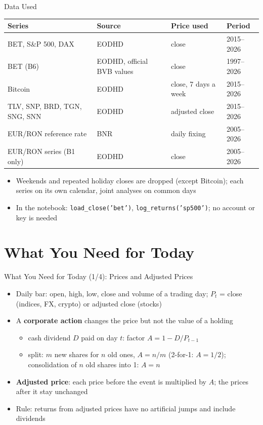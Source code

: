 \begin{frame}{Data Used}
\itemsize{\small}
\begin{center}
\footnotesize
\begin{tabular}{llll}
\toprule
\textbf{Series} & \textbf{Source} & \textbf{Price used} & \textbf{Period} \\
\midrule
BET, S\&P 500, DAX & EODHD & close & 2015--2026 \\
BET (B6) & EODHD, official BVB values & close & 1997--2026 \\
Bitcoin & EODHD & close, 7 days a week & 2015--2026 \\
TLV, SNP, BRD, TGN, SNG, SNN & EODHD & adjusted close & 2015--2026 \\
EUR/RON reference rate & BNR & daily fixing & 2005--2026 \\
EUR/RON series (B1 only) & EODHD & close & 2005--2026 \\
\bottomrule
\end{tabular}
\end{center}
\begin{itemize}
    \item Weekends and repeated holiday closes are dropped (except Bitcoin); each series on its own calendar, joint analyses on common days
    \item In the notebook: \texttt{load\_close('bet')}, \texttt{log\_returns('sp500')}; no account or key is needed
\end{itemize}
\end{frame}


\section{What You Need for Today}

\begin{frame}{What You Need for Today (1/4): Prices and Adjusted Prices}
\itemsize{\small}
\begin{itemize}
    \item Daily bar: open, high, low, close and volume of a trading day; $P_t$ = close (indices, FX, crypto) or adjusted close (stocks)
    \item A \textbf{corporate action} changes the price but not the value of a holding
    \begin{itemize}
        \item cash dividend $D$ paid on day $t$: factor $A = 1 - D/P_{t-1}$
        \item split: $m$ new shares for $n$ old ones, $A = n/m$ (2-for-1: $A = 1/2$); consolidation of $n$ old shares into 1: $A = n$
    \end{itemize}
    \item \textbf{Adjusted price}: each price before the event is multiplied by $A$; the prices after it stay unchanged
    \item Rule: returns from adjusted prices have no artificial jumps and include dividends
\end{itemize}
\end{frame}

